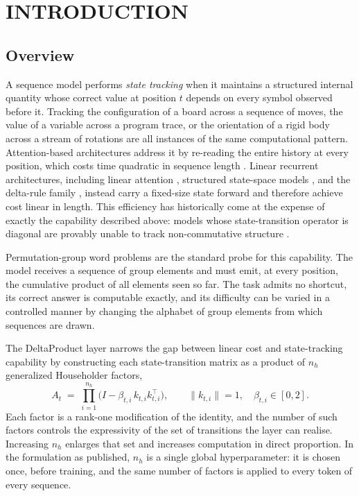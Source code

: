 \chapter{INTRODUCTION}
\section{Overview}

A sequence model performs \emph{state tracking} when it maintains a structured
internal quantity whose correct value at position $t$ depends on every symbol
observed before it. Tracking the configuration of a board across a sequence of
moves, the value of a variable across a program trace, or the orientation of a
rigid body across a stream of rotations are all instances of the same
computational pattern. Attention-based architectures address it by re-reading the
entire history at every position, which costs time quadratic in sequence length
\cite{attention}. Linear recurrent architectures, including linear attention
\cite{lineartransformers}, structured state-space models \cite{s4, mamba}, and
the delta-rule family \cite{fastweight, deltanet}, instead carry a fixed-size
state forward and therefore achieve cost linear in length. This efficiency has
historically come at the expense of exactly the capability described above:
models whose state-transition operator is diagonal are provably unable to track
non-commutative structure \cite{illusionofstate, diagonalssm}.

Permutation-group word problems are the standard probe for this capability. The
model receives a sequence of group elements and must emit, at every position, the
cumulative product of all elements seen so far. The task admits no shortcut, its
correct answer is computable exactly, and its difficulty can be varied in a
controlled manner by changing the alphabet of group elements from which sequences
are drawn.

The DeltaProduct layer \cite{deltaproduct} narrows the gap between linear cost
and state-tracking capability by constructing each state-transition matrix as a
product of $n_h$ generalized Householder factors,
\begin{equation}
A_t \;=\; \prod_{i=1}^{n_h} \bigl( I - \beta_{t,i}\, k_{t,i} k_{t,i}^{\!\top} \bigr),
\qquad \lVert k_{t,i} \rVert = 1, \quad \beta_{t,i} \in [0,2].
\label{eq:deltaproduct}
\end{equation}
Each factor is a rank-one modification of the identity, and the number of such
factors controls the expressivity of the set of transitions the layer can
realise. Increasing $n_h$ enlarges that set and increases computation in direct
proportion. In the formulation as published, $n_h$ is a single global
hyperparameter: it is chosen once, before training, and the same number of
factors is applied to every token of every sequence.

